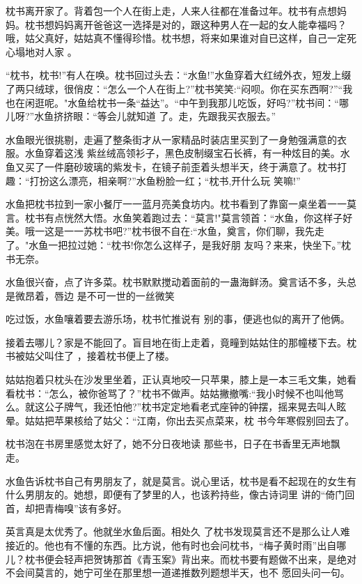 \documentclass{article}
\begin{document}
枕书离开家了。背着包一个人在街上走，人来人往都在准备过年。枕书有点想妈妈。枕书想妈妈离开爸爸这一选择是对的，跟这种男人在一起的女人能幸福吗？哦，姑父真好，姑姑真不懂得珍惜。枕书想，将来如果谁对自已这样，自己一定死心塌地对人家
。 

“枕书，枕书!”有人在唤。枕书回过头去：“水鱼!”水鱼穿着大红绒外衣，短发上缀了两只绒球，很俏皮：“怎么一个人在街上?”枕书笑笑:“闷呗。你在买东西啊?”“我也在闲逛呢。"水鱼给枕书一条“益达”。“中午到我那儿吃饭，好吗?”枕书间：“哪儿呀?”水鱼挤挤眼：“等会儿就知道
了。走，先跟我买衣服去。” 

水鱼眼光很挑剔，走遍了整条街才从一家精品时装店里买到了一身勉强满意的衣服。水鱼穿着这浅
\newpage
紫丝绒高领衫子，黑色皮制缀宝石长裤，有一种炫目的美。水鱼又买了一件磨砂玻璃的紫发卡，在镜子前歪着头想半天，终于满意了。枕书打趣：“打扮这么漂亮，相亲啊?”水鱼粉脸一红；“枕书,开什么玩
笑嘛!” 

水鱼把枕书拉到一家小餐厅一一蓝月亮美食坊内。枕书看到了靠窗一桌坐着一一莫言。枕书有点恍然大悟。水鱼笑着跑过去：“莫言!"莫言领首：“水鱼，你这样子好美。哦一这是一一苏枕书吧?”枕书很不自在:“水鱼，奠言，你们聊，我先走了。"水鱼一把拉过她：“枕书!你怎么这样子，是我好朋
友吗？来来，快坐下。”枕书无奈。 

水鱼很兴奋，点了许多菜。枕书默默搅动着面前的一蛊海鲜汤。奠言话不多，头总是微昂着，唇边
是不可一世的一丝微笑 

吃过饭，水鱼嚷着要去游乐场，枕书忙推说有
别的事，便逃也似的离开了他俩。 

\newpage

接着去哪儿？家是不能回了。盲目地在街上走着，竟疃到姑姑住的那幢楼下去。枕书被姑父叫住了
，接着枕书便上了楼。 

姑姑抱着只枕头在沙发里坐着，正认真地咬一只苹果，膝上是一本三毛文集，她看看枕书：“怎么，被你爸骂了？”枕书不做声。姑姑撇撤嘴:“我小时候不也叫他骂么。就这公子牌气，我还怕他?”枕书定定地看老式座钟的钟摆，摇来晃去叫人眩晕。姑姑把苹果核给了姑父：“江南，你出去买点菜来，枕
书今年寒假别回去了。 

枕书泡在书房里感觉太好了，她不分日夜地读
那些书，日子在书香里无声地飘走。 

水鱼告诉枕书自己有男朋友了，就是莫言。说心里话，枕书是看不起现在的女生有什么男朋友的。她想，即便有了梦里的人，也该矜持些，像古诗词里
讲的“倚门回首，却把青梅嗅”该有多好。 

英言真是太优秀了。他就坐水鱼后面。相处久
\newpage
了枕书发现莫言还不是那么让人难接近的。他也有不懂的东西。比方说，他有时也会问枕书，“梅子黄时雨”出自哪儿？枕书便会轻声把贺铸那首《青玉案》背出来。而枕书要有题做不出来，是绝对不会间莫言的，她宁可坐在那里想一道递推数列题想半天，也不
愿回头问一句。 
\end{document}
